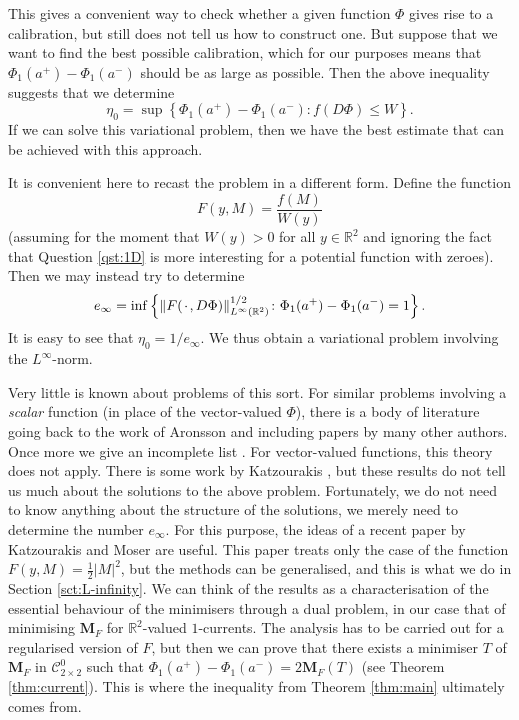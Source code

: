 \documentclass[a4paper]{article}
\newcommand{\R}{\mathbb{R}}
\newcommand{\M}{\mathbf{M}}
\newcommand{\ncrt}{\mathcal{C}}
\newcommand{\blank}{{\mkern 2mu\cdot\mkern 2mu}}
\newcommand{\set}[2]{\left\{ #1 \colon #2 \right\}}
\theoremstyle{definition}
\theoremstyle{remark}
\begin{document}
This gives a convenient way to check whether a given function $\Phi$ gives rise to a calibration,
but still does not tell us how to construct one. But suppose that we want to find the best possible
calibration, which for our purposes means that $\Phi_1(a^+) - \Phi_1(a^-)$ should be as large as
possible. Then the above inequality suggests that we determine
\[
\eta_0 = \sup\set{\Phi_1(a^+) - \Phi_1(a^-)}{f(D\Phi) \le W}.
\]
If we can solve this variational problem, then we have the best estimate that can be
achieved with this approach.

It is convenient here to recast the problem in a different form. Define the function
\[
F(y, M) = \frac{f(M)}{W(y)}
\]
(assuming for the moment that $W(y) > 0$ for all $y \in \R^2$ and ignoring the fact that
Question \ref{qst:1D} is more interesting for a potential function with zeroes). Then
we may instead try to determine
\[
e_\infty = \inf\set{\|F(\blank, D\Phi)\|_{L^\infty(\R^2)}^{1/2}}{\Phi_1(a^+) - \Phi_1(a^-) = 1}.
\]
It is easy to see that $\eta_0 = 1/e_\infty$. We thus obtain a variational problem involving the
$L^\infty$-norm.

Very little is known about problems of this sort. For similar problems involving a \emph{scalar} function
(in place of the vector-valued $\Phi$), there is a body of literature going back to the work of Aronsson
\cite{Aronsson:65, Aronsson:66, Aronsson:67, Aronsson:68} and including papers by many other authors.
Once more we give an incomplete list \cite{Bhattacharya-DiBenedetto-Manfredi:89, Jensen:93, Savin:05, Evans-Savin:08}.
For vector-valued functions, this theory does not apply. There is some work by
Katzourakis \cite{Katzourakis:12, Katzourakis:13, Katzourakis:17.3}, but these results
do not tell us much about the solutions to the above problem. Fortunately, we do not need to know
anything about the structure of the solutions, we merely need to determine the number $e_\infty$.
For this purpose, the ideas of a recent paper by Katzourakis and Moser \cite{Katzourakis-Moser:25}
are useful. This paper treats only the case of the function $F(y, M) = \frac{1}{2} |M|^2$, but
the methods can be generalised, and this is what we do in Section \ref{sct:L-infinity}.
We can think of the results as a characterisation of the essential behaviour of the minimisers
through a dual problem, in our case that of minimising $\M_F$ for $\R^2$-valued $1$-currents.
The analysis has to be carried out for a regularised version of $F$, but then we can prove that there
exists a minimiser $T$ of $\M_F$ in $\ncrt_{2 \times 2}^0$ such that $\Phi_1(a^+) - \Phi_1(a^-) = 2\M_F(T)$ (see Theorem \ref{thm:current}).
This is where the inequality from Theorem \ref{thm:main} ultimately comes from.
\end{document}
